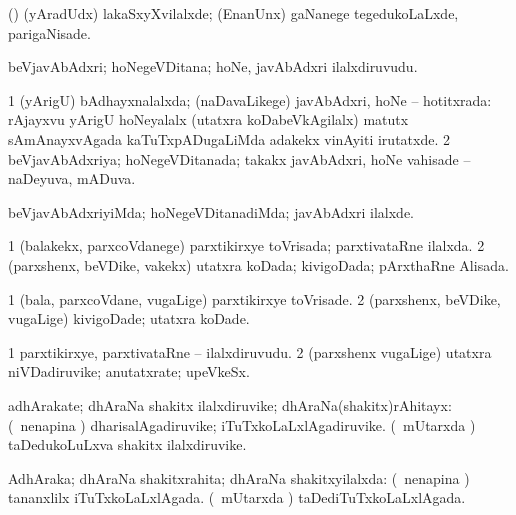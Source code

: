 \bentry
{}
\gl{\kirxvi}
\bmng
(\gaparx) (yAradUdx) lakaSxyXvilalxde; (EnanUnx) gaNanege tegedukoLaLxde, parigaNisade. 
\emng
\eentry

\bentry
{}
\gl{\nA}
\expl{}
\bmng
beVjavAbAdxri; hoNegeVDitana; hoNe, javAbAdxri ilalxdiruvudu. 
\emng
\eentry

\bentry
{}
\gl{\gu}
\bmng
\bnum
\num{1} (yArigU) bAdhayxnalalxda; (naDavaLikege) javAbAdxri, hoNe -- hotitxrada:  rAjayxvu yArigU hoNeyalalx (utatxra koDabeVkAgilalx) matutx sAmAnayxvAgada kaTuTxpADugaLiMda adakekx vinAyiti irutatxde. 
\num{2} beVjavAbAdxriya; hoNegeVDitanada; takakx javAbAdxri, hoNe vahisade -- naDeyuva, mADuva. 
\enum
\emng
\eentry

\bentry
{}
\gl{\kirxvi}
\bmng
beVjavAbAdxriyiMda; hoNegeVDitanadiMda; javAbAdxri ilalxde. 
\emng
\eentry

\bentry
{}
\gl{\gu}
\bmng
\bnum
\num{1} (balakekx, parxcoVdanege) parxtikirxye toVrisada; parxtivataRne ilalxda. 
\num{2} (parxshenx, beVDike, \mo vakekx) utatxra koDada; kivigoDada; pArxthaRne Alisada. 
\enum
\emng
\eentry

\bentry
{}
\gl{\kirxvi}
\bmng
\bnum
\num{1} (bala, parxcoVdane, \mo vugaLige) parxtikirxye toVrisade. 
\num{2} (parxshenx, beVDike, \mo vugaLige) kivigoDade; utatxra koDade. 
\enum
\emng
\eentry

\bentry
{}
\gl{\nA}
\bmng
\bnum
\num{1} parxtikirxye, parxtivataRne -- ilalxdiruvudu. 
\num{2} (parxshenx \mo vugaLige) utatxra niVDadiruvike; anutatxrate; upeVkeSx. 
\enum
\emng
\eentry

\bentry
{}
\gl{\nA}
\bmng
adhArakate; dhAraNa shakitx ilalxdiruvike; dhAraNa(shakitx)rAhitayx: 
\banum
{} (\kanmu\ nenapina \vi) dharisalAgadiruvike; iTuTxkoLaLxlAgadiruvike. 
 (\kanmu\ mUtarxda \vi) taDedukoLuLxva shakitx ilalxdiruvike. 
\eanum
\emng
\eentry

\bentry
{}
\gl{\gu}
\bmng
AdhAraka; dhAraNa shakitxrahita; dhAraNa shakitxyilalxda: 
\banum
{} (\kanmu\ nenapina \vi) tananxlilx iTuTxkoLaLxlAgada. 
 (\kanmu\ mUtarxda \vi) taDediTuTxkoLaLxlAgada. 
\eanum
\emng
\eentry

